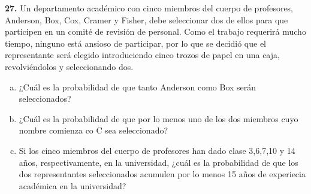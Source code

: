 \documentclass[12pt, letterpaper, spanish]{article}
\begin{document}
\textbf{27.} Un departamento académico con cinco miembros del cuerpo de profesores, Anderson, Box, Cox, Cramer y Fisher, debe seleccionar dos de ellos para que participen en un comité de revisión de personal. Como el trabajo requerirá mucho tiempo, ninguno está ansioso de participar, por lo que se decidió  que el representante será elegido introduciendo cinco trozos de papel en una caja, revolviéndolos y seleccionando dos.
\begin{enumerate}[a)]
    \item ¿Cuál es la probabilidad de que tanto Anderson como Box serán seleccionados?
    \item ¿Cuál es la probabilidad de que por lo menos uno de los dos miembros cuyo nombre comienza co C sea seleccionado?
    \item Si los cinco miembros del cuerpo de profesores han dado clase 3,6,7,10 y 14 años, respectivamente, en la universidad, ¿cuál es la probabilidad de que los dos representantes seleccionados acumulen por lo menos 15 años de experiecia académica en la universidad?
\end{enumerate}
\end{document}
